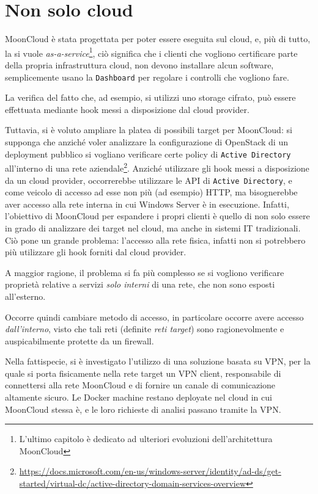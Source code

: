\section{Non solo cloud}\label{sec:mooncloud-not-only-cloud}
MoonCloud è stata progettata per poter essere eseguita sul cloud, e, più di tutto,
la si vuole \textit{as-a-service}\footnote{L'ultimo capitolo è dedicato ad ulteriori
evoluzioni dell'architettura MoonCloud}, ciò significa che i clienti che vogliono
certificare parte della propria infrastruttura cloud, non devono installare alcun
software, semplicemente usano la \texttt{Dashboard} per regolare i controlli
che vogliono fare.

La verifica del fatto che, ad esempio, si utilizzi uno storage cifrato, può essere
effettuata mediante hook messi a disposizione dal cloud provider.

Tuttavia, si è voluto ampliare la platea di possibili target per MoonCloud:
si supponga che anziché voler analizzare la configurazione di OpenStack di
un deployment pubblico si vogliano verificare certe policy di \texttt{Active
Directory} all'interno di una rete aziendale\footnote{\url{https://docs.microsoft.com/en-us/windows-server/identity/ad-ds/get-started/virtual-dc/active-directory-domain-services-overview}}.
Anziché utilizzare gli hook messi a disposizione da un cloud provider, occorrerebbe
utilizzare le API di \texttt{Active Directory}, e come veicolo di accesso ad esse
non più (ad esempio) HTTP, ma bisognerebbe aver accesso alla rete interna
in cui Windows Server è in esecuzione.
Infatti, l'obiettivo di MoonCloud per espandere i propri clienti è quello di non
solo essere in grado di analizzare dei target nel cloud, ma anche in sistemi IT tradizionali.
Ciò pone un grande problema: l'accesso alla rete fisica, infatti non si potrebbero
più utilizzare gli hook forniti dal cloud provider.

A maggior ragione, il problema si fa più complesso se si vogliono verificare
proprietà relative a servizi \textit{solo interni} di una rete, che non sono
esposti all'esterno.

Occorre quindi cambiare metodo di accesso, in particolare occorre avere accesso
\textit{dall'interno}, visto che tali reti (definite \textit{reti target})
sono ragionevolmente e auspicabilmente protette da un firewall.

Nella fattispecie, si è investigato l'utilizzo di una soluzione basata su VPN,
per la quale si porta fisicamente nella rete target un VPN client, responsabile
di connettersi alla rete MoonCloud e di fornire un canale di comunicazione
altamente sicuro.
Le Docker machine restano deployate nel cloud in cui MoonCloud stessa è, e le
loro richieste di analisi passano tramite la VPN.

